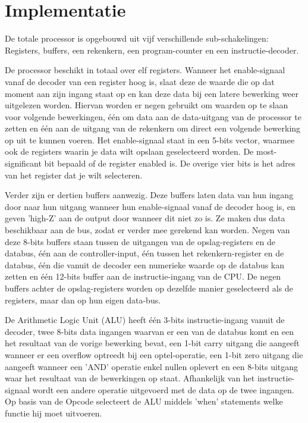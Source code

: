 \documentclass[oneside,dutch]{tudelft-report}
\begin{document}
\section{Implementatie}
De totale processor is opgebouwd uit vijf verschillende sub-schakelingen: Registers, buffers, een rekenkern, een program-counter en een instructie-decoder.

De processor beschikt in totaal over elf registers. Wanneer het enable-signaal vanaf de decoder van een register hoog is, slaat deze de waarde die op dat moment aan zijn ingang staat op en kan deze data bij een latere bewerking weer uitgelezen worden. Hiervan worden er negen gebruikt om waarden op te slaan voor volgende bewerkingen, één om data aan de data-uitgang van de processor te zetten en één aan de uitgang van de rekenkern om direct een volgende bewerking op uit te kunnen voeren. Het enable-signaal staat in een 5-bits vector, waarmee ook de registers waarin je data wilt opslaan geselecteerd worden. De most-significant bit bepaald of de register enabled is. De overige vier bits is het adres van het register dat je wilt selecteren.

Verder zijn er dertien buffers aanwezig. Deze buffers laten data van hun ingang door naar hun uitgang wanneer hun enable-signaal vanaf de decoder hoog is, en geven 'high-Z' aan de output door wanneer dit niet zo is. Ze maken dus data beschikbaar aan de bus, zodat er verder mee gerekend kan worden. Negen van deze 8-bits buffers staan tussen de uitgangen van de opslag-registers en de databus, één aan de controller-input, één tussen het rekenkern-register en de databus, één die vanuit de decoder een numerieke waarde op de databus kan zetten en één 12-bits buffer aan de instructie-ingang van de CPU. De negen buffers achter de opslag-registers worden op dezelfde manier geselecteerd als de registers, maar dan op hun eigen data-bus.

De Arithmetic Logic Unit (ALU) heeft één 3-bits instructie-ingang vanuit de decoder, twee 8-bits data ingangen waarvan er een van de databus komt en een het resultaat van de vorige bewerking bevat, een 1-bit carry uitgang die aangeeft wanneer er een overflow optreedt bij een optel-operatie, een 1-bit zero uitgang die aangeeft wanneer een 'AND' operatie enkel nullen oplevert en een 8-bits uitgang waar het resultaat van de bewerkingen op staat. Afhankelijk van het instructie-signaal wordt een andere operatie uitgevoerd met de data op de twee ingangen.
Op basis van de Opcode selecteert de ALU middels 'when' statements welke functie hij moet uitvoeren.
\end{document}
